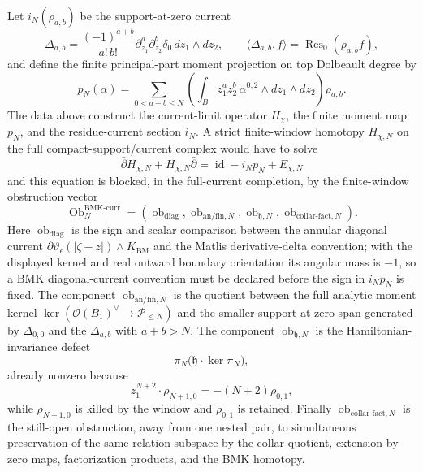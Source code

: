 \documentclass[11pt]{memoir}
\begin{document}
\begin{prop}
  Let \(i_N(\rho_{a,b})\) be the support-at-zero current
  \[
    \Delta_{a,b}
      =
      \frac{(-1)^{a+b}}{a!\,b!}
      \partial_{z_1}^a\partial_{z_2}^b
      \delta_0\,d\bar z_1\wedge d\bar z_2,
    \qquad
    \langle\Delta_{a,b},f\rangle
      =
      \operatorname{Res}_0(\rho_{a,b}f),
  \]
  and define the finite principal-part moment projection on top Dolbeault
  degree by
  \[
    p_N(\alpha)
      =
      \sum_{0<a+b\leq N}
      \left(
        \int_B z_1^az_2^b\,
        \alpha^{0,2}\wedge dz_1\wedge dz_2
      \right)\rho_{a,b}.
  \]
  The data above construct the current-limit operator \(H_\chi\), the
  finite moment map \(p_N\), and the residue-current section \(i_N\).
  A strict finite-window homotopy \(H_{\chi,N}\) on the full
  compact-support/current complex would have to solve
  \[
    \bar\partial H_{\chi,N}
    +H_{\chi,N}\bar\partial
    =
    \operatorname{id}-i_Np_N+E_{\chi,N}
  \tag{\(\ast_N\)}
  \]
  and this equation is blocked, in the full-current completion, by the
  finite-window
  obstruction vector
  \[
    \operatorname{Ob}^{\mathrm{BMK\mbox{-}curr}}_N
    =
    \left(
      \operatorname{ob}_{\mathrm{diag}},
      \operatorname{ob}_{\mathrm{an}/\mathrm{fin},N},
      \operatorname{ob}_{\mathfrak h,N},
      \operatorname{ob}_{\mathrm{collar\mbox{-}fact},N}
    \right).
  \]
  Here \(\operatorname{ob}_{\mathrm{diag}}\) is the sign and scalar
  comparison between the annular diagonal current
  \(\bar\partial\vartheta_\epsilon(|\zeta-z|)\wedge K_{\mathrm{BM}}\)
  and the Matlis derivative-delta convention; with the displayed kernel
  and real outward boundary orientation its angular mass is \(-1\), so a
  BMK diagonal-current convention must be declared before the sign in
  \(i_Np_N\) is fixed.  The component
  \(\operatorname{ob}_{\mathrm{an}/\mathrm{fin},N}\) is the quotient
  between the full analytic moment kernel
  \(\ker(\mathcal O(B_1)^\vee\to\mathcal P_{\le N})\) and the smaller
  support-at-zero span generated by \(\Delta_{0,0}\) and the
  \(\Delta_{a,b}\) with \(a+b>N\).  The component
  \(\operatorname{ob}_{\mathfrak h,N}\) is the Hamiltonian-invariance
  defect
  \[
    \pi_N\bigl(\mathfrak h\cdot\ker\pi_N\bigr),
  \]
  already nonzero because
  \[
    z_1^{N+2}\cdot\rho_{N+1,0}=-(N+2)\rho_{0,1},
  \]
  while \(\rho_{N+1,0}\) is killed by the window and
  \(\rho_{0,1}\) is retained.  Finally
  \(\operatorname{ob}_{\mathrm{collar\mbox{-}fact},N}\) is the
  still-open obstruction, away from one nested pair, to simultaneous
  preservation of the same relation subspace by the collar quotient,
  extension-by-zero maps, factorization products, and the BMK homotopy.


\end{prop}
\end{document}
